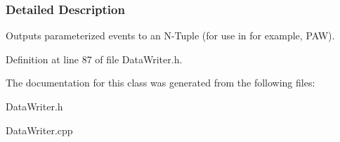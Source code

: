\subsubsection{Detailed Description}
Outputs parameterized events to an N-\/Tuple (for use in for example, PAW). 

Definition at line 87 of file DataWriter.h.



The documentation for this class was generated from the following files:\begin{DoxyCompactItemize}
\item 
DataWriter.h\item 
DataWriter.cpp\end{DoxyCompactItemize}
